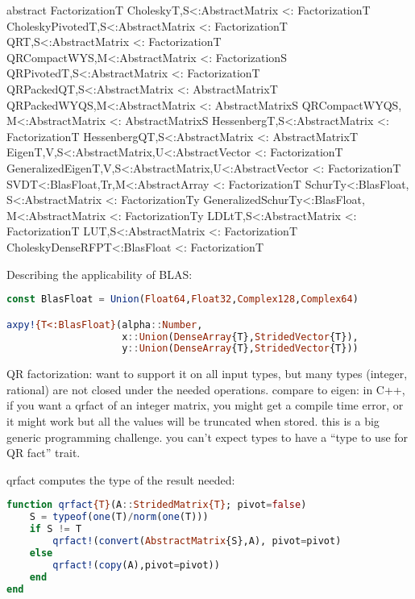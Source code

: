 abstract Factorization{T}
Cholesky{T,S<:AbstractMatrix} <: Factorization{T}
CholeskyPivoted{T,S<:AbstractMatrix} <: Factorization{T}
QR{T,S<:AbstractMatrix} <: Factorization{T}
QRCompactWY{S,M<:AbstractMatrix} <: Factorization{S}
QRPivoted{T,S<:AbstractMatrix} <: Factorization{T}
QRPackedQ{T,S<:AbstractMatrix} <: AbstractMatrix{T}
QRPackedWYQ{S,M<:AbstractMatrix} <: AbstractMatrix{S}
QRCompactWYQ{S, M<:AbstractMatrix} <: AbstractMatrix{S}
Hessenberg{T,S<:AbstractMatrix} <: Factorization{T}
HessenbergQ{T,S<:AbstractMatrix} <: AbstractMatrix{T}
Eigen{T,V,S<:AbstractMatrix,U<:AbstractVector} <: Factorization{T}
GeneralizedEigen{T,V,S<:AbstractMatrix,U<:AbstractVector} <: Factorization{T}
SVD{T<:BlasFloat,Tr,M<:AbstractArray} <: Factorization{T}
Schur{Ty<:BlasFloat, S<:AbstractMatrix} <: Factorization{Ty}
GeneralizedSchur{Ty<:BlasFloat, M<:AbstractMatrix} <: Factorization{Ty}
LDLt{T,S<:AbstractMatrix} <: Factorization{T}
LU{T,S<:AbstractMatrix} <: Factorization{T}
CholeskyDenseRFP{T<:BlasFloat} <: Factorization{T}
\fi

Describing the applicability of BLAS:

\begin{singlespace}
\begin{lstlisting}[language=julia]
const BlasFloat = Union(Float64,Float32,Complex128,Complex64)

axpy!{T<:BlasFloat}(alpha::Number,
                    x::Union(DenseArray{T},StridedVector{T}),
                    y::Union(DenseArray{T},StridedVector{T}))
\end{lstlisting}
\end{singlespace}

\iffalse
QR factorization: want to support it on all input types, but many
types (integer, rational) are not closed under the needed operations.
compare to eigen: in C++, if you want a qrfact of an integer matrix,
you might get a compile time error, or it might work but all the values
will be truncated when stored. this is a big generic programming
challenge. you can't expect types to have a ``type to use for QR fact''
trait.

qrfact computes the type of the result needed:

\begin{singlespace}
\begin{lstlisting}[language=julia]
function qrfact{T}(A::StridedMatrix{T}; pivot=false)
    S = typeof(one(T)/norm(one(T)))
    if S != T
        qrfact!(convert(AbstractMatrix{S},A), pivot=pivot)
    else
        qrfact!(copy(A),pivot=pivot))
    end
end
\end{lstlisting}
\end{singlespace}

